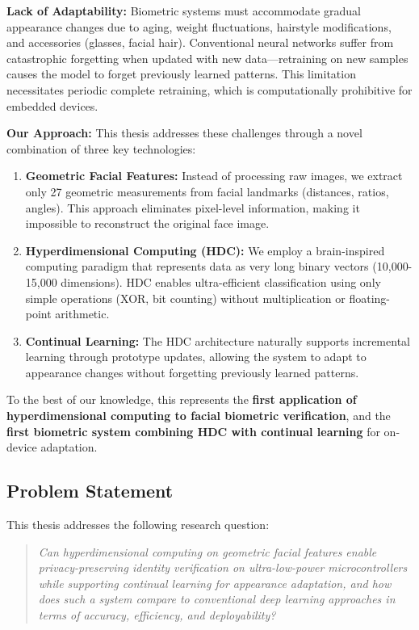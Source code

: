 \documentclass[a4paper,12pt]{article}
\begin{document}
\textbf{Lack of Adaptability:} Biometric systems must accommodate gradual appearance changes due to aging, weight fluctuations, hairstyle modifications, and accessories (glasses, facial hair). Conventional neural networks suffer from catastrophic forgetting when updated with new data—retraining on new samples causes the model to forget previously learned patterns. This limitation necessitates periodic complete retraining, which is computationally prohibitive for embedded devices.

\textbf{Our Approach:} This thesis addresses these challenges through a novel combination of three key technologies:
\begin{enumerate}
    \item \textbf{Geometric Facial Features:} Instead of processing raw images, we extract only 27 geometric measurements from facial landmarks (distances, ratios, angles). This approach eliminates pixel-level information, making it impossible to reconstruct the original face image.
    
    \item \textbf{Hyperdimensional Computing (HDC):} We employ a brain-inspired computing paradigm that represents data as very long binary vectors (10,000-15,000 dimensions). HDC enables ultra-efficient classification using only simple operations (XOR, bit counting) without multiplication or floating-point arithmetic.
    
    \item \textbf{Continual Learning:} The HDC architecture naturally supports incremental learning through prototype updates, allowing the system to adapt to appearance changes without forgetting previously learned patterns.
\end{enumerate}

To the best of our knowledge, this represents the \textbf{first application of hyperdimensional computing to facial biometric verification}, and the \textbf{first biometric system combining HDC with continual learning} for on-device adaptation.

\subsection{Problem Statement}

This thesis addresses the following research question:

\begin{quote}
\textit{Can hyperdimensional computing on geometric facial features enable privacy-preserving identity verification on ultra-low-power microcontrollers while supporting continual learning for appearance adaptation, and how does such a system compare to conventional deep learning approaches in terms of accuracy, efficiency, and deployability?}
\end{quote}
\end{document}
